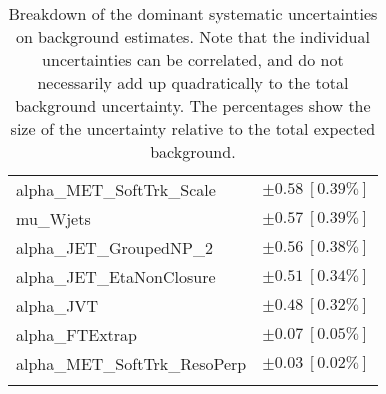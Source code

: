 \begin{table}
\begin{center}
\begin{tabular*}{\textwidth}{@{\extracolsep{\fill}}lc}
alpha\_MET\_SoftTrk\_Scale         & $\pm 0.58\ [0.39\%] $       \\
mu\_Wjets         & $\pm 0.57\ [0.39\%] $       \\
alpha\_JET\_GroupedNP\_2         & $\pm 0.56\ [0.38\%] $       \\
alpha\_JET\_EtaNonClosure         & $\pm 0.51\ [0.34\%] $       \\
alpha\_JVT         & $\pm 0.48\ [0.32\%] $       \\
alpha\_FTExtrap         & $\pm 0.07\ [0.05\%] $       \\
alpha\_MET\_SoftTrk\_ResoPerp         & $\pm 0.03\ [0.02\%] $       \\
\noalign{\smallskip}\hline\noalign{\smallskip}
\end{tabular*}
\end{center}
\caption[Breakdown of uncertainty on background estimates]{
Breakdown of the dominant systematic uncertainties on background estimates.
Note that the individual uncertainties can be correlated, and do not necessarily add up quadratically to 
the total background uncertainty. The percentages show the size of the uncertainty relative to the total expected background.
\label{table.results.bkgestimate.uncertainties.VRTopBTW}}
\end{table}
%